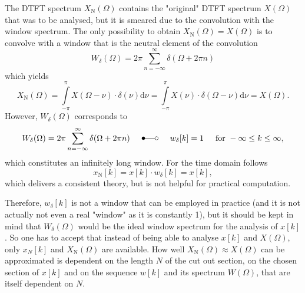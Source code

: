 \documentclass[11pt,a4paper,DIV=12]{scrartcl}
\begin{document}
The DTFT spectrum $X_\text{N}(\Omega)$ contains the "original" DTFT spectrum
$X(\Omega)$ that was to be analysed, but it is smeared due to the convolution
with the window spectrum.
%
The only possibility to obtain $X_\text{N}(\Omega)=X(\Omega)$ is to convolve
with a window that is the neutral element of the convolution
%
\begin{equation}
W_\delta(\Omega)=2\pi\sum_{n=-\infty}^{\infty}\delta(\Omega+2\pi n)
\end{equation}
%
which yields
%
\begin{equation}
X_\text{N}(\Omega)=\int\limits_{-\pi}^{\pi}X(\Omega-\nu)\cdot\delta(\nu)\text{d}\nu
=\int\limits_{-\pi}^{\pi}X(\nu)\cdot\delta(\Omega-\nu)\text{d}\nu=X(\Omega).
\end{equation}
%
However, $W_\delta(\Omega)$ corresponds to \cite[tab.~2.3, p.~90]{Oppenheim2010}
\begin{equation}
W_\delta(\Omega)=2\pi\sum\limits_{n=-\infty}^{\infty}\delta(\Omega+2\pi n) \hspace{5mm}\Laplace\hspace{5mm} w_\delta[k]=1 \hspace{5mm} \text{for}\,\,-\infty\leq k\leq\infty,
\end{equation}
which constitutes an infinitely long window.
%
For the time domain follows
\begin{equation}
x_\text{N}[k]=x[k]\cdot w_\delta[k]=x[k],
\end{equation}
which delivers a consistent theory, but is not helpful for practical computation.

Therefore, $w_\delta[k]$ is not a window that can be employed in practice
(and it is not actually not even a real "window" as it is constantly 1),
but it should be kept in mind that $W_\delta(\Omega)$ would be the ideal window
spectrum for the analysis of $x[k]$.
%
So one has to accept that instead of being able to analyse $x[k]$ and $X(\Omega)$,
only $x_N[k]$ and $X_\text{N}(\Omega)$ are available.
%
How well $X_\text{N}(\Omega)\approx X(\Omega)$ can be approximated is dependent
on the length $N$ of the cut out section, on the chosen section of $x[k]$ and
on the sequence $w[k]$ and its spectrum $W(\Omega)$, that are itself dependent
on $N$.
\end{document}
